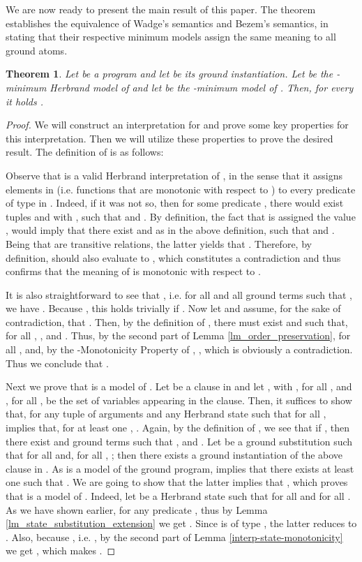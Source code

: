 \documentclass[submission,copyright]{eptcs}
\newtheorem{theorem}{Theorem}
\theoremstyle{definition}
\begin{document}
{We are now ready to present the main result of this paper. The theorem
establishes the equivalence of Wadge's semantics and Bezem's semantics, in
stating that their respective minimum models assign the same meaning to all ground atoms.}
\begin{theorem}
Let  be a program and let  be its ground instantiation.
Let  be the -minimum Herbrand model of  and let  be the
-minimum model of . Then, for every 
it holds .
\end{theorem}
\begin{proof}


We will construct an interpretation  for  and prove
some key properties for this interpretation. Then we will utilize these properties
to prove the desired result. The definition of  is as follows:



Observe that  is a valid Herbrand interpretation of , in the sense
that it assigns elements in  (i.e. functions that are monotonic with
respect to ) to every predicate of type  in . Indeed,
if it was not so, then for some predicate ,
there would exist tuples  and  with
, such that
 and .
By definition, the fact that  is assigned the value
, would imply that there exist  and 
as in the above definition, such that  and
. Being that 
are transitive relations, the latter yields that
. Therefore, by definition,
 should also evaluate to , which constitutes a
contradiction and thus confirms that the meaning of  is monotonic with respect to .

It is also straightforward to see that , i.e.
for all  and all ground terms 
such that , we have
. Because
, this holds trivially if .
Now let  and assume, for the sake of
contradiction, that . Then, by the definition
of , there must exist  and  such that, for
all , ,  and .
Thus, by the second part of Lemma \ref{lm_order_preservation}, for all ,  and,
by the -Monotonicity Property of , ,
which is obviously a contradiction. Thus we conclude that .

Next we prove that  is a model of . Let  be a clause in  and let , with , for all , and , for all , be the set of variables appearing in the clause. Then, it suffices to show that, for any tuple  of arguments and any Herbrand state  such that  for all ,  implies that, for at least one , . Again, by the definition of , we see that if , then there exist  and ground terms  such that ,  and . Let  be a ground substitution such that  for all  and, for all , ; then there exists a ground instantiation  of the above clause in . As  is a model of the ground program,  implies that there exists at least one  such that . We are going to show that the latter implies that , which proves that  is a model of . Indeed, let  be a Herbrand state such that  for all  and  for all . As we have shown earlier,  for any predicate , thus by Lemma \ref{lm_state_substitution_extension} we get . Since  is of type , the latter reduces to . Also, because , i.e. , by the second part of Lemma \ref{interp-state-monotonicity} we get , which makes .


\end{proof}
\end{document}

